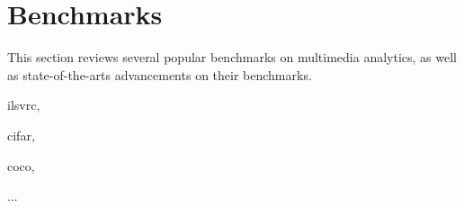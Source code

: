 
\section{Benchmarks}
\label{sec:data}

This section reviews several popular benchmarks on multimedia analytics, as well as state-of-the-arts advancements on their benchmarks.

ilsvrc, 

cifar, 

coco, 

...